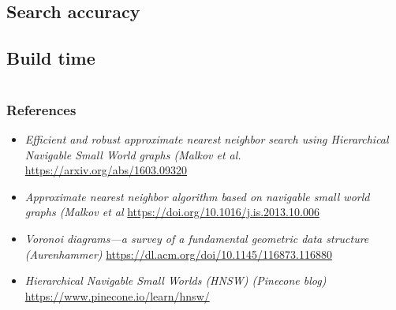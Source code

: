 \documentclass{beamer}
\begin{document}
\subsection{Search accuracy}




\subsection{Build time}

\section{}
  \begin{frame}
    \frametitle{References}  
    \small
    \begin{itemize}
	\item \textit{Efficient and robust approximate nearest neighbor search using Hierarchical Navigable Small World graphs (Malkov et al.} \url{https://arxiv.org/abs/1603.09320}    

	\item \textit{Approximate nearest neighbor algorithm based on navigable small world graphs (Malkov et al} \url{https://doi.org/10.1016/j.is.2013.10.006}	
	\item \textit{Voronoi diagrams—a survey of a fundamental geometric data structure (Aurenhammer)} \url{https://dl.acm.org/doi/10.1145/116873.116880}
	\item \textit{Hierarchical Navigable Small Worlds (HNSW) (Pinecone blog)} \url{https://www.pinecone.io/learn/hnsw/}
	\end{itemize}
	
  \end{frame}
\end{document}
